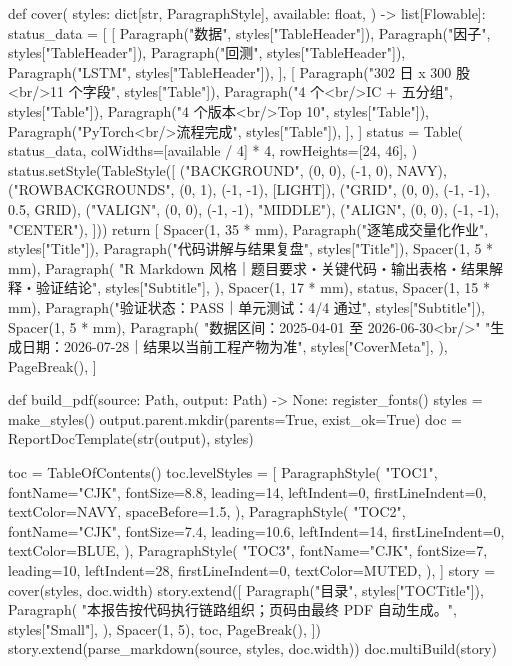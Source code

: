 \documentclass[UTF8,a4paper,fontset=fandol]{ctexart}
\begin{document}
\begin{ProjectCode}
def cover(
    styles: dict[str, ParagraphStyle],
    available: float,
) -> list[Flowable]:
    status_data = [
        [
            Paragraph("数据", styles["TableHeader"]),
            Paragraph("因子", styles["TableHeader"]),
            Paragraph("回测", styles["TableHeader"]),
            Paragraph("LSTM", styles["TableHeader"]),
        ],
        [
            Paragraph("302 日 x 300 股<br/>11 个字段", styles["Table"]),
            Paragraph("4 个<br/>IC + 五分组", styles["Table"]),
            Paragraph("4 个版本<br/>Top 10", styles["Table"]),
            Paragraph("PyTorch<br/>流程完成", styles["Table"]),
        ],
    ]
    status = Table(
        status_data,
        colWidths=[available / 4] * 4,
        rowHeights=[24, 46],
    )
    status.setStyle(TableStyle([
        ("BACKGROUND", (0, 0), (-1, 0), NAVY),
        ("ROWBACKGROUNDS", (0, 1), (-1, -1), [LIGHT]),
        ("GRID", (0, 0), (-1, -1), 0.5, GRID),
        ("VALIGN", (0, 0), (-1, -1), "MIDDLE"),
        ("ALIGN", (0, 0), (-1, -1), "CENTER"),
    ]))
    return [
        Spacer(1, 35 * mm),
        Paragraph("逐笔成交量化作业", styles["Title"]),
        Paragraph("代码讲解与结果复盘", styles["Title"]),
        Spacer(1, 5 * mm),
        Paragraph(
            "R Markdown 风格｜题目要求・关键代码・输出表格・结果解释・验证结论",
            styles["Subtitle"],
        ),
        Spacer(1, 17 * mm),
        status,
        Spacer(1, 15 * mm),
        Paragraph("验证状态：PASS｜单元测试：4/4 通过", styles["Subtitle"]),
        Spacer(1, 5 * mm),
        Paragraph(
            "数据区间：2025-04-01 至 2026-06-30<br/>"
            "生成日期：2026-07-28｜结果以当前工程产物为准",
            styles["CoverMeta"],
        ),
        PageBreak(),
    ]


def build_pdf(source: Path, output: Path) -> None:
    register_fonts()
    styles = make_styles()
    output.parent.mkdir(parents=True, exist_ok=True)
    doc = ReportDocTemplate(str(output), styles)

    toc = TableOfContents()
    toc.levelStyles = [
        ParagraphStyle(
            "TOC1",
            fontName="CJK",
            fontSize=8.8,
            leading=14,
            leftIndent=0,
            firstLineIndent=0,
            textColor=NAVY,
            spaceBefore=1.5,
        ),
        ParagraphStyle(
            "TOC2",
            fontName="CJK",
            fontSize=7.4,
            leading=10.6,
            leftIndent=14,
            firstLineIndent=0,
            textColor=BLUE,
        ),
        ParagraphStyle(
            "TOC3",
            fontName="CJK",
            fontSize=7,
            leading=10,
            leftIndent=28,
            firstLineIndent=0,
            textColor=MUTED,
        ),
    ]
    story = cover(styles, doc.width)
    story.extend([
        Paragraph("目录", styles["TOCTitle"]),
        Paragraph(
            "本报告按代码执行链路组织；页码由最终 PDF 自动生成。",
            styles["Small"],
        ),
        Spacer(1, 5),
        toc,
        PageBreak(),
    ])
    story.extend(parse_markdown(source, styles, doc.width))
    doc.multiBuild(story)



\end{ProjectCode}
\end{document}
